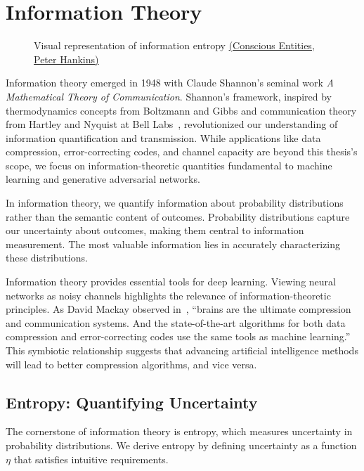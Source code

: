\section{Information Theory}%
\label{sec:information-theory}
\vspace{0.5cm}
\begin{figure}[h!]%
	\label{fig:info}
	\centering
	\caption{Visual representation of information entropy \href{https://www.consciousentities.com/2017/02/consciousness-entropy/}{(Conscious Entities, Peter Hankins)}}
\end{figure}
\vspace{0.5cm}

Information theory emerged in 1948 with Claude Shannon's seminal work \textit{A Mathematical Theory of Communication}. Shannon's framework, inspired by thermodynamics concepts from Boltzmann and Gibbs and communication theory from Hartley and Nyquist at Bell Labs~\cite{ref:losee-1997}, revolutionized our understanding of information quantification and transmission. While applications like data compression, error-correcting codes, and channel capacity are beyond this thesis's scope, we focus on information-theoretic quantities fundamental to machine learning and generative adversarial networks.

\begin{remark}
	In information theory, we quantify information about probability distributions rather than the semantic content of outcomes. Probability distributions capture our uncertainty about outcomes, making them central to information measurement. The most valuable information lies in accurately characterizing these distributions.
\end{remark}

Information theory provides essential tools for deep learning. Viewing neural networks as noisy channels highlights the relevance of information-theoretic principles. As David Mackay observed in~\cite{ref:mackay-2003}, ``brains are the ultimate compression and communication systems. And the state-of-the-art algorithms for both data compression and error-correcting codes use the same tools as machine learning.'' This symbiotic relationship suggests that advancing artificial intelligence methods will lead to better compression algorithms, and vice versa.

\subsection{Entropy: Quantifying Uncertainty}
The cornerstone of information theory is entropy, which measures uncertainty in probability distributions. We derive entropy by defining uncertainty as a function $\eta$ that satisfies intuitive requirements.

